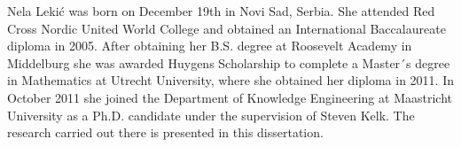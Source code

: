 
Nela Leki\'c was born on December 19th in Novi Sad, Serbia. She attended Red Cross Nordic United World College and obtained an International Baccalaureate diploma in 2005. After obtaining her B.S. degree at Roosevelt Academy in Middelburg she was awarded Huygens Scholarship to complete a Master´s degree in Mathematics at Utrecht University, where she obtained her diploma in 2011. In October 2011 she joined the Department of Knowledge Engineering at Maastricht University as a Ph.D. candidate under the supervision of Steven Kelk. The research carried out there is presented in this dissertation. 